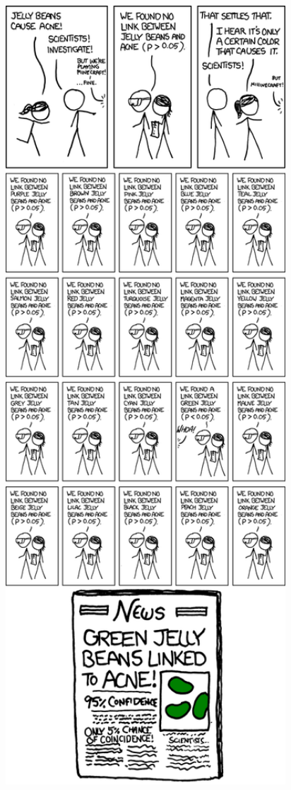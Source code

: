 \documentclass[slidestop,compress,mathserif]{beamer}
\begin{document}

\begin{frame}
\begin{center}
\includegraphics[width=0.9\textwidth]{xkcd_significance.png}
\end{center}
\end{frame}
\end{document}

